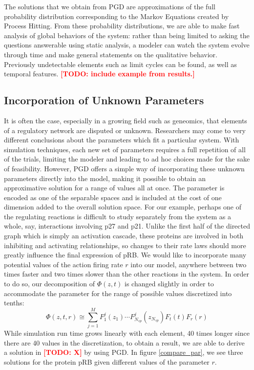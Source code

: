 \documentclass{article}
\newcommand{\lighttodo}[1]{\textcolor{red}{#1}}
\newcommand{\todo}[1]{\lighttodo{\textbf{[TODO: #1]}}}
\begin{document}
The solutions that we obtain from PGD are approximations of the full probability distribution corresponding to the Markov Equations created by Process Hitting. From these probability distributions, we are able to make fast analysis of global behaviors of the system: rather than being limited to asking the questions answerable using static analysis, a modeler can watch the system evolve through time and make general statements on the qualitative behavior. Previously undetectable elements such as limit cycles can be found, as well as temporal features. \todo{include example from results.}

\subsection{Incorporation of Unknown Parameters}\label{parameter}
It is often the case, especially in a growing field such as geneomics, that elements of a regulatory network are disputed or unknown. Researchers may come to very different conclusions about the parameters which fit a particular system. With simulation techniques, each new set of parameters requires a full repetition of all of the trials, limiting the modeler and leading to ad hoc choices made for the sake of feasibility. However, PGD offers a simple way of incorporating these unknown parameters directly into the model, making it possible to obtain an approximative solution for a range of values all at once\cite{chinesta2010use}. The parameter is encoded as one of the separable spaces and is included at the cost of one dimension added to the overall solution space. For our example, perhaps one of the regulating reactions is difficult to study separately from the system as a whole, say, interactions involving p27 and p21. Unlike the first half of the directed graph which is simply an activation cascade, these proteins are involved in both inhibiting and activating relationships, so changes to their rate laws should more greatly influence the final expression of pRB. We would like to incorporate many potential values of the action firing rate $r$ into our model, anywhere between two times faster and two times slower than the other reactions in the system. In order to do so, our decomposition of $\Phi(z,t)$ is changed slightly in order to accommodate the parameter for the range of possible values discretized into tenths:
\[
 \Phi(z,t,r)\cong \sum_{j=1}^{M}F_1^j(z_1)\cdots F_{N_{sp}}^j(z_{N_{sp}})F_t(t)F_r(r)
\]
While simulation run time grows linearly with each element, 40 times longer since there are 40 values in the discretization, to obtain a result, we are able to derive a solution in \todo{X} by using PGD. In figure \ref{compare_par}, we see three solutions for the protein pRB given different values of the parameter $r$.
\end{document}
